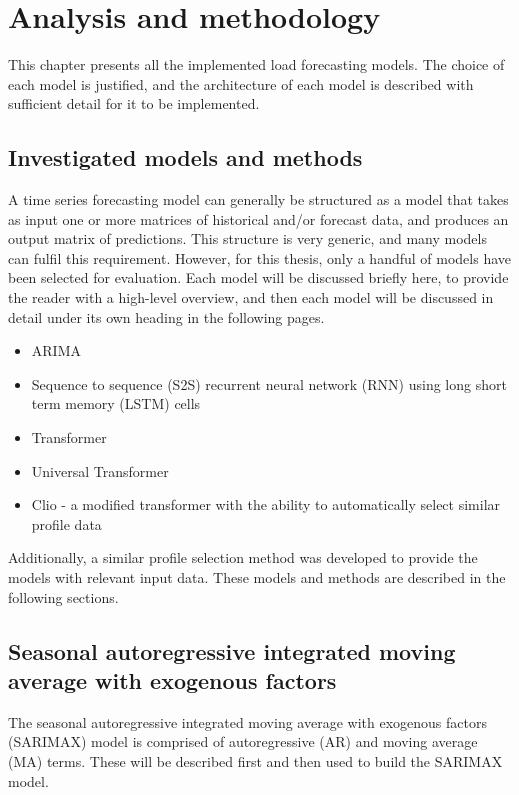 \chapter{Analysis and methodology}
\label{ana-meth}

This chapter presents all the implemented load forecasting models.
The choice of each model is justified, and the architecture of each model is described with sufficient detail for it to be implemented.

\section{Investigated models and methods}

A time series forecasting model can generally be structured as a model that takes as input one or more matrices of historical and/or forecast data, and produces an output matrix of predictions.
This structure is very generic, and many models can fulfil this requirement.
However, for this thesis, only a handful of models have been selected for evaluation.
Each model will be discussed briefly here, to provide the reader with a high-level overview, and then each model will be discussed in detail under its own heading in the following pages.

\begin{itemize}
	\item ARIMA
	\item Sequence to sequence (S2S) recurrent neural network (RNN) \citep{Cho2014a} using long short term memory (LSTM) \citep{hochreiter1997long} cells
	\item Transformer \citep{Vaswani2017}
	\item Universal Transformer \cite{Dehghani2018}
	\item Clio - a modified transformer with the ability to automatically select similar profile data
\end{itemize}

Additionally, a similar profile selection method was developed to provide the models with relevant input data.
These models and methods are described in the following sections.

\section{Seasonal autoregressive integrated moving average with exogenous factors}

The seasonal autoregressive integrated moving average with exogenous factors (SARIMAX) model is comprised of autoregressive (AR) and moving average (MA) terms.
These will be described first and then used to build the SARIMAX model.

